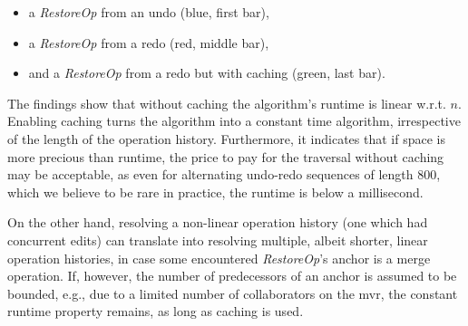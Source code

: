 \documentclass[sigplan,10pt]{acmart}
\newcommand{\restopkind}{\textit{RestoreOp}}
\begin{document}
\begin{itemize}
  \item a \restopkind{} from an undo (blue, first bar),
  \item a \restopkind{} from a redo (red, middle bar),
  \item and a \restopkind{} from a redo but with caching (green, last bar).
\end{itemize}

The findings show that without caching the algorithm's runtime is linear
w.r.t. $n$.
Enabling caching turns the algorithm into a constant time algorithm,
irrespective of the length of the operation history.
Furthermore, it indicates that if space is more precious than runtime,
the price to pay for the traversal without caching may be acceptable,
as even for alternating undo-redo sequences of length 800,
which we believe to be rare in practice, the runtime is below a millisecond.

On the other hand, resolving a non-linear operation history (one which had
concurrent edits) can translate into resolving multiple, albeit shorter,
linear operation histories, in case some encountered \restopkind{}'s anchor
is a merge operation.
If, however, the number of predecessors of an anchor is assumed to be bounded,
e.g., due to a limited number of collaborators on the \gls{mvr},
the constant runtime property remains, as long as caching is used.
\end{document}
